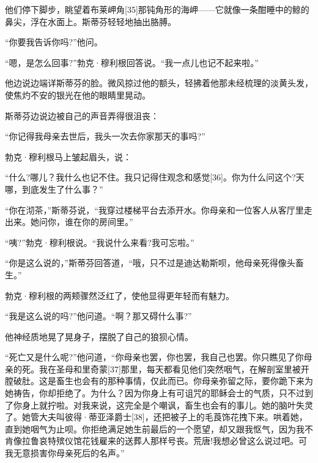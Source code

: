 \documentclass{article}
\begin{document}
他们停下脚步，眺望着布莱岬角[35]那钝角形的海岬——它就像一条酣睡中的鲸的鼻尖，浮在水面上。斯蒂芬轻轻地抽出胳膊。



“你要我告诉你吗?”他问。



“嗯，是怎么回事?”勃克·穆利根回答说。“我一点儿也记不起来啦。”



他边说边端详斯蒂芬的脸。微风掠过他的额头，轻拂着他那未经梳理的淡黄头发，使焦灼不安的银光在他的眼睛里晃动。



斯蒂芬边说边被自己的声音弄得很沮丧：



“你记得我母亲去世后，我头一次去你家那天的事吗?”



勃克·穆利根马上皱起眉头，说：



“什么?哪儿？我什么也记不住。我只记得住观念和感觉[36]。你为什么问这个?天哪，到底发生了什么事？”



“你在沏茶，”斯蒂芬说，“我穿过楼梯平台去添开水。你母亲和一位客人从客厅里走出来。她问你，谁在你的房间里。”



“咦?”勃克·穆利根说。“我说什么来看?我可忘啦。”



“你是这么说的，”斯蒂芬回答道，“哦，只不过是迪达勒斯呗，他母亲死得像头畜生。”



勃克·穆利根的两颊骤然泛红了，使他显得更年轻而有魅力。



“我是这么说的吗?”他问道。“啊？那又碍什么事?”



他神经质地晃了晃身子，摆脱了自己的狼狈心情。



“死亡又是什么呢?”他问道，“你母亲也罢，你也罢，我自己也罢。你只瞧见了你母亲的死。我在圣母和里奇蒙[37]那里，每天都看见他们突然咽气，在解剖室里被开膛破肚。这是畜生也会有的那种事情，仅此而已。你母亲弥留之际，要你跪下来为她祷告，你却拒绝了。为什么？因为你身上有可诅咒的耶稣会士的气质，只不过到了你身上就拧啦。对我来说，这完全是个嘲讽，畜生也会有的事儿。她的脑叶失灵了。她管大夫叫彼得·蒂亚泽爵士[38]，还把被子上的毛莨饰花拽下来。哄着她，直到她咽气为止呗。你拒绝满足她生前最后的一个愿望，却又跟我怄气，因为我不肯像拉鲁哀特殡仪馆花钱雇来的送葬人那样号丧。荒唐!我想必曾这么说过吧。可我无意损害你母亲死后的名声。”
\end{document}
